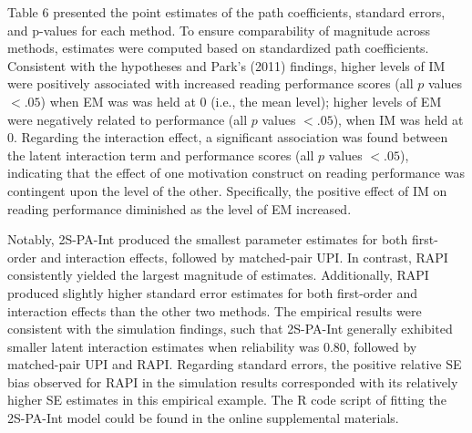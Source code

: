 \documentclass[
  man]{apa6}
\begin{document}
Table 6 presented the point estimates of the path coefficients, standard errors, and p-values for each method. To ensure comparability of magnitude across methods, estimates were computed based on standardized path coefficients. Consistent with the hypotheses and Park's (2011) findings, higher levels of IM were positively associated with increased reading performance scores (all \(\textit{p}\) values \(< .05\)) when EM was was held at 0 (i.e., the mean level); higher levels of EM were negatively related to performance (all \(\textit{p}\) values \(< .05\)), when IM was held at 0. Regarding the interaction effect, a significant association was found between the latent interaction term and performance scores (all \(\textit{p}\) values \(< .05\)), indicating that the effect of one motivation construct on reading performance was contingent upon the level of the other. Specifically, the positive effect of IM on reading performance diminished as the level of EM increased.

Notably, 2S-PA-Int produced the smallest parameter estimates for both first-order and interaction effects, followed by matched-pair UPI. In contrast, RAPI consistently yielded the largest magnitude of estimates. Additionally, RAPI produced slightly higher standard error estimates for both first-order and interaction effects than the other two methods. The empirical results were consistent with the simulation findings, such that 2S-PA-Int generally exhibited smaller latent interaction estimates when reliability was 0.80, followed by matched-pair UPI and RAPI. Regarding standard errors, the positive relative SE bias observed for RAPI in the simulation results corresponded with its relatively higher SE estimates in this empirical example. The R code script of fitting the 2S-PA-Int model could be found in the online supplemental materials.
\end{document}
